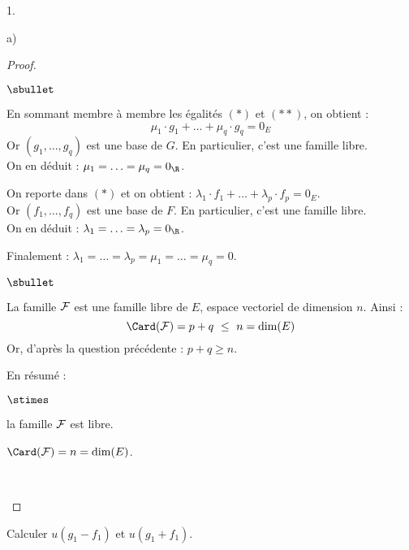 \documentclass[11pt]{article}%
\begin{document}
\begin{noliste}{1.}
\begin{noliste}{a)}
\begin{proof}
\begin{remark}
\begin{noliste}{$\sbullet$}
        \item En sommant membre à membre les égalités $(*)$ et $(**)$,
          on obtient :
          \[
          \mu_1 \cdot g_1 + \ldots + \mu_q \cdot g_q = 0_E
          \]
          Or $(g_1,\hdots, g_q)$ est une base de $G$. En particulier,
          c'est une famille libre.\\
          On en déduit : $\mu_1 = \ldots = \mu_q = 0_{\R}$.
          
        \item On reporte dans $(*)$ et on obtient : $\lambda_1 \cdot
          f_1 + \ldots + \lambda_p \cdot f_p = 0_E$.\\
          Or $(f_1,\hdots, f_q)$ est une base de $F$. En particulier,
          c'est une famille libre.\\
          On en déduit : $\lambda_1 = \ldots = \lambda_p = 0_{\R}$.
          
        \item Finalement : $\lambda_1 = \ldots = \lambda_p = \mu_1 =
          \ldots = \mu_q = 0$.%
        \end{noliste}
      \end{remark}


    \newpage


    \begin{noliste}{$\sbullet$}
    \item La famille ${\cal F}$ est une famille libre de $E$, espace
      vectoriel de dimension $n$. Ainsi :
      \[
      \Card({\cal F}) = p+q \ \leq \ n = \dim(E)
      \]
      Or, d'après la question précédente : $p+q \geq n$.%
      
    \item En résumé :
      \begin{noliste}{$\stimes$}
      \item la famille ${\cal F}$ est libre.
      \item $\Card({\cal F}) = n = \dim(E)$.
      \end{noliste}
      ~\\[-1.6cm]
    \end{noliste}    
    \end{proof}
  
  \item Calculer $u(g_1-f_1)$ et $u(g_1+f_1)$.
    

\end{noliste}
\end{noliste}
\end{document}

